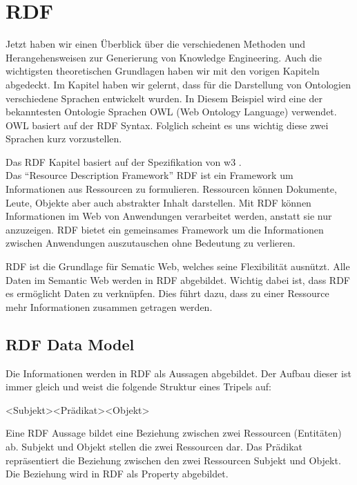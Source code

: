 \chapter{RDF}
\label{chap:rdf}
Jetzt haben wir einen Überblick über die verschiedenen Methoden und Herangehensweisen zur Generierung von Knowledge Engineering. Auch die wichtigsten theoretischen Grundlagen haben wir mit den vorigen Kapiteln abgedeckt. Im Kapitel  haben wir gelernt, dass für die Darstellung von Ontologien verschiedene Sprachen entwickelt wurden. In Diesem Beispiel wird eine der bekanntesten Ontologie Sprachen OWL (Web Ontology Language) verwendet. OWL basiert auf der RDF Syntax. Folglich scheint es uns wichtig diese zwei Sprachen kurz vorzustellen. 

Das RDF Kapitel basiert auf der Spezifikation von w3 \cite{w3rdf}.\\
Das "`Resource Description Framework"' RDF ist ein Framework um Informationen aus Ressourcen zu formulieren. Ressourcen können Dokumente, Leute, Objekte aber auch abstrakter Inhalt darstellen. Mit RDF können Informationen im Web von Anwendungen verarbeitet werden, anstatt sie nur anzuzeigen. RDF bietet ein gemeinsames Framework um die Informationen zwischen Anwendungen auszutauschen ohne Bedeutung zu verlieren. 

RDF ist die Grundlage für Sematic Web, welches seine Flexibilität ausnützt. Alle Daten im Semantic Web werden in RDF abgebildet. Wichtig dabei ist, dass RDF es ermöglicht Daten zu verknüpfen. Dies führt dazu, dass zu einer Ressource mehr Informationen zusammen getragen werden.\cite{cambSemRDF}

\section{RDF Data Model}
\label{sec:rdf_rdf_dataModel}
Die Informationen werden in RDF als Aussagen abgebildet. Der Aufbau dieser  ist immer gleich und weist die folgende Struktur eines Tripels auf:

\noindent\hspace*{15mm}<Subjekt><Prädikat><Objekt>

Eine RDF Aussage bildet eine Beziehung zwischen zwei Ressourcen (Entitäten) ab. 
Subjekt und Objekt stellen die zwei Ressourcen dar. Das Prädikat repräsentiert die Beziehung zwischen den zwei Ressourcen Subjekt und Objekt. Die Beziehung wird in RDF als Property abgebildet. 
 
